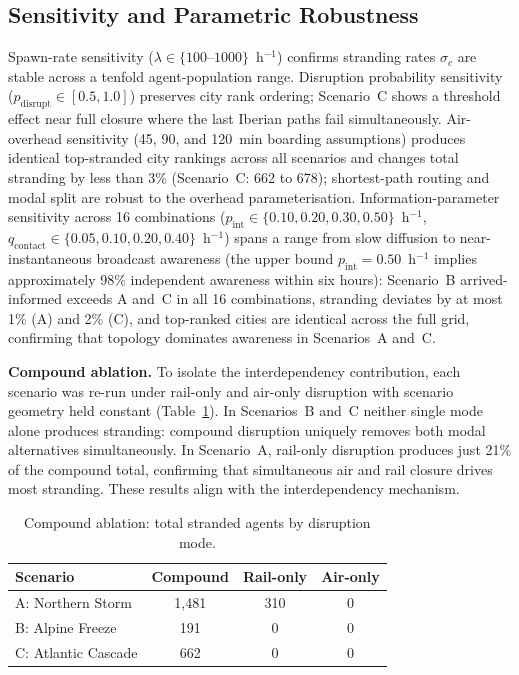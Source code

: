 \documentclass[12pt,a4paper]{article}
\begin{document}
\subsection{Sensitivity and Parametric Robustness}

Spawn-rate sensitivity ($\lambda \in \{100\text{--}1000\}$~h$^{-1}$) confirms stranding rates $\sigma_c$ are stable across a tenfold agent-population range.
Disruption probability sensitivity ($p_{\text{disrupt}} \in [0.5, 1.0]$) preserves city rank ordering; Scenario~C shows a threshold effect near full closure where the last Iberian paths fail simultaneously.
Air-overhead sensitivity (45, 90, and 120~min boarding assumptions) produces
identical top-stranded city rankings across all scenarios and changes total stranding
by less than 3\% (Scenario~C: 662 to 678); shortest-path routing and modal split
are robust to the overhead parameterisation.
Information-parameter sensitivity across 16 combinations ($p_{\text{int}} \in \{0.10,0.20,0.30,0.50\}$~h$^{-1}$, $q_{\text{contact}} \in \{0.05,0.10,0.20,0.40\}$~h$^{-1}$) spans a range from slow diffusion to near-instantaneous broadcast awareness (the upper bound $p_{\text{int}} = 0.50$~h$^{-1}$ implies approximately 98\% independent awareness within six hours): Scenario~B arrived-informed exceeds A and~C in all 16 combinations, stranding deviates by at most 1\% (A) and 2\% (C), and top-ranked cities are identical across the full grid, confirming that topology dominates awareness in Scenarios~A and~C.

\textbf{Compound ablation.}
To isolate the interdependency contribution, each scenario was re-run under
rail-only and air-only disruption with scenario geometry held constant
(Table~\ref{tab:ablation}).
In Scenarios~B and~C neither single mode alone produces stranding: compound disruption
uniquely removes both modal alternatives simultaneously.
In Scenario~A, rail-only disruption produces just 21\% of the compound total,
confirming that simultaneous air and rail closure drives most stranding.
These results align with the \citet{Buldyrev2010} interdependency mechanism.

\begin{table}[h]
\centering
\caption{Compound ablation: total stranded agents by disruption mode.}
\label{tab:ablation}
\small
\begin{tabular}{lccc}
\toprule
Scenario & Compound & Rail-only & Air-only \\
\midrule
A: Northern Storm   & 1,481 & 310 & 0 \\
B: Alpine Freeze    &   191 &   0 & 0 \\
C: Atlantic Cascade &   662 &   0 & 0 \\
\bottomrule
\end{tabular}
\end{table}
\end{document}
